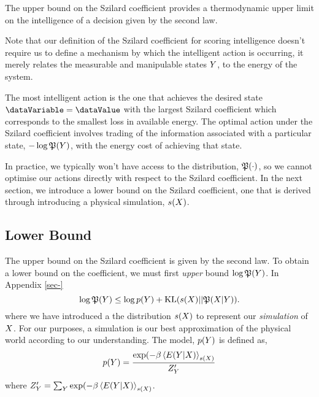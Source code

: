 \documentclass[]{article}
\begin{document}
The upper bound on the Szilard coefficient provides a thermodynamic upper limit on the intelligence of a decision given by the second law. 

Note that our definition of the Szilard coefficient for scoring intelligence doesn't require us to define a mechanism by which the intelligent action is occurring, it merely relates the measurable and manipulable states $Y$, to the energy of the system.

The most intelligent action is the one that achieves the desired state $\dataVariable = \dataValue$ with the largest Szilard coefficient which corresponds to the smallest loss in available energy. The optimal action under the Szilard coefficient involves trading of the information associated with a particular state, $-\log \mathfrak{P}(Y)$, with the energy cost of achieving that state.

In practice, we typically won't have access to the distribution, $\mathfrak{P}(\cdot)$, so we cannot optimise our actions directly with respect to the Szilard coefficient. In the next section, we introduce a lower bound on the Szilard coefficient, one that is derived through introducing a physical simulation, $s(X)$.

\subsection{Lower Bound}

The upper bound on the Szilard coefficient is given by the second law. To obtain a lower bound on the coefficient, we must first \emph{upper} bound $\log \mathfrak{P}(Y)$. In Appendix \ref{sec-}
\[
\log \mathfrak{P}(Y) \leq \log p(Y)
+
\text{KL}(s(X)||\mathfrak{P}(X|Y)).
\]
where we have introduced a the distribution $s(X)$ to represent our \emph{simulation} of  $X$. For our purposes, a simulation is our best approximation of the physical world according to our understanding. The model, $p(Y)$ is defined as,
$$
p(Y) = \frac{\exp(-\beta \left\langle E(Y|X) \right\rangle_{s(X)}}{Z^\prime_Y}
$$
where $Z^\prime_Y = \sum_Y \exp(-\beta \left\langle E(Y|X) \right\rangle_{s(X)}$. 
\end{document}

